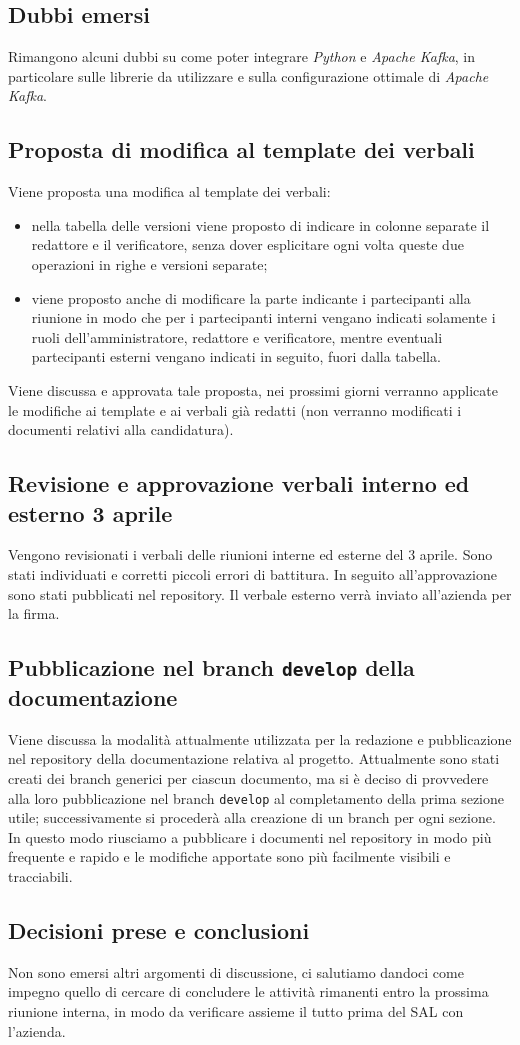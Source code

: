 \documentclass[italian,12pt]{article}
\begin{document}
\subsection{Dubbi emersi}
Rimangono alcuni dubbi su come poter integrare \textit{Python} e \textit{Apache Kafka}, in particolare sulle librerie da utilizzare e sulla configurazione ottimale di \textit{Apache Kafka}.

\subsection{Proposta di modifica al template dei verbali}
Viene proposta una modifica al template dei verbali:
\begin{itemize}
	\item nella tabella delle versioni viene proposto di indicare in colonne separate il redattore e il verificatore, senza dover esplicitare ogni volta queste due operazioni in righe e versioni separate;
	\item viene proposto anche di modificare la parte indicante i partecipanti alla riunione in modo che per i partecipanti interni vengano indicati solamente i ruoli dell'amministratore, redattore e verificatore, mentre eventuali partecipanti esterni vengano indicati in seguito, fuori dalla tabella.
\end{itemize}
Viene discussa e approvata tale proposta, nei prossimi giorni verranno applicate le modifiche ai template e ai verbali già redatti (non verranno modificati i documenti relativi alla candidatura).

\subsection{Revisione e approvazione verbali interno ed esterno 3 aprile}
Vengono revisionati i verbali delle riunioni interne ed esterne del 3 aprile. Sono stati individuati e corretti piccoli errori di battitura. In seguito all'approvazione sono stati pubblicati nel repository. Il verbale esterno verrà inviato all'azienda per la firma.

\subsection{Pubblicazione nel branch \texttt{develop} della documentazione}
Viene discussa la modalità attualmente utilizzata per la redazione e pubblicazione nel repository della documentazione relativa al progetto. Attualmente sono stati creati dei branch generici per ciascun documento, ma si è deciso di provvedere alla loro pubblicazione nel branch \texttt{develop} al completamento della prima sezione utile; successivamente si procederà alla creazione di un branch per ogni sezione. In questo modo riusciamo a pubblicare i documenti nel repository in modo più frequente e rapido e le modifiche apportate sono più facilmente visibili e tracciabili.

\subsection{Decisioni prese e conclusioni}
Non sono emersi altri argomenti di discussione, ci salutiamo dandoci come impegno quello di cercare di concludere le attività rimanenti entro la prossima riunione interna, in modo da verificare assieme il tutto prima del SAL con l'azienda.
\end{document}
